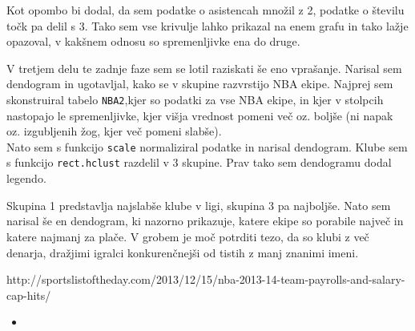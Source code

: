 \documentclass[11pt,a4paper]{article}
\begin{document}
Kot opombo bi dodal, da sem podatke o asistencah množil z 2, podatke o številu točk pa delil s 3. Tako sem vse krivulje lahko prikazal na enem grafu in tako lažje opazoval, v kakšnem odnosu so spremenljivke ena do druge.



\newline
V tretjem delu te zadnje faze sem se lotil raziskati še eno vprašanje. Narisal sem dendogram in ugotavljal, kako se v skupine razvrstijo NBA ekipe. Najprej sem skonstruiral tabelo \verb|NBA2|,kjer so podatki za vse NBA ekipe,
in kjer v stolpcih nastopajo le spremenljivke, kjer višja vrednost pomeni več oz. boljše (ni napak oz. izgubljenih žog, kjer več pomeni slabše).\\

Nato sem s funkcijo \verb|scale| normaliziral podatke in narisal dendogram.
Klube sem s funkcijo \verb|rect.hclust| razdelil v 3 skupine. Prav tako sem dendogramu dodal legendo.\\


Skupina 1 predstavlja najslabše klube v ligi, skupina 3 pa najboljše.
Nato sem narisal še en dendogram, ki nazorno prikazuje, katere ekipe so porabile največ in katere najmanj za plače. V grobem je moč potrditi tezo, da so klubi z več denarja, dražjimi igralci konkurenčnejši od tistih z manj znanimi imeni.\\


http://sportslistoftheday.com/2013/12/15/nba-2013-14-team-payrolls-and-salary-cap-hits/
\begin{itemize}
  \item 

\end{itemize}
\end{document}
